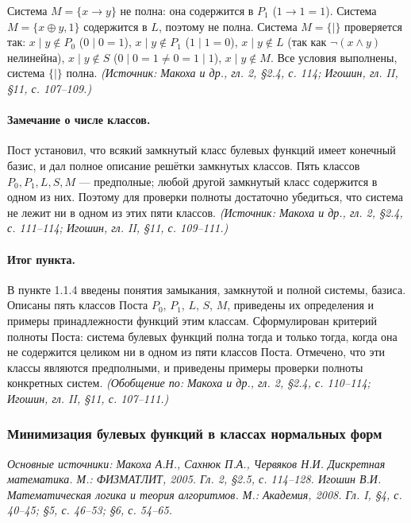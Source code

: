 \documentclass[a4paper,12pt]{article}
\begin{document}
Система \(M=\{x\to y\}\) не полна: она содержится в \(P_1\) (\(1\to 1=1\)). Система \(M=\{x\oplus y,1\}\) содержится в \(L\), поэтому не полна. Система \(M=\{\mid\}\) проверяется так: \(x\mid y\notin P_0\) (\(0\mid 0=1\)), \(x\mid y\notin P_1\) (\(1\mid 1=0\)), \(x\mid y\notin L\) (так как \(\neg(x\land y)\) нелинейна), \(x\mid y\notin S\) (\(0\mid 0=1\ne 0=1\mid 1\)), \(x\mid y\notin M\). Все условия выполнены, система \(\{\mid\}\) полна.
\textit{(Источник: Макоха и др., гл. 2, §2.4, с. 114; Игошин, гл. II, §11, с. 107--109.)}

\paragraph{Замечание о числе классов.}
Пост установил, что всякий замкнутый класс булевых функций имеет конечный базис, и дал полное описание решётки замкнутых классов. Пять классов \(P_0,P_1,L,S,M\) — предполные; любой другой замкнутый класс содержится в одном из них. Поэтому для проверки полноты достаточно убедиться, что система не лежит ни в одном из этих пяти классов.
\textit{(Источник: Макоха и др., гл. 2, §2.4, с. 111--114; Игошин, гл. II, §11, с. 109--111.)}

\paragraph{Итог пункта.}
В пункте 1.1.4 введены понятия замыкания, замкнутой и полной системы, базиса. Описаны пять классов Поста \(P_0\), \(P_1\), \(L\), \(S\), \(M\), приведены их определения и примеры принадлежности функций этим классам. Сформулирован критерий полноты Поста: система булевых функций полна тогда и только тогда, когда она не содержится целиком ни в одном из пяти классов Поста. Отмечено, что эти классы являются предполными, и приведены примеры проверки полноты конкретных систем.
\textit{(Обобщение по: Макоха и др., гл. 2, §2.4, с. 110--114; Игошин, гл. II, §11, с. 107--111.)}

\subsubsection{Минимизация булевых функций в классах нормальных форм}

\noindent\textit{Основные источники: Макоха А.Н., Сахнюк П.А., Червяков Н.И. Дискретная математика. М.: ФИЗМАТЛИТ, 2005. Гл. 2, §2.5, с. 114--128. Игошин В.И. Математическая логика и теория алгоритмов. М.: Академия, 2008. Гл. I, §4, с. 40--45; §5, с. 46--53; §6, с. 54--65.}
\end{document}

